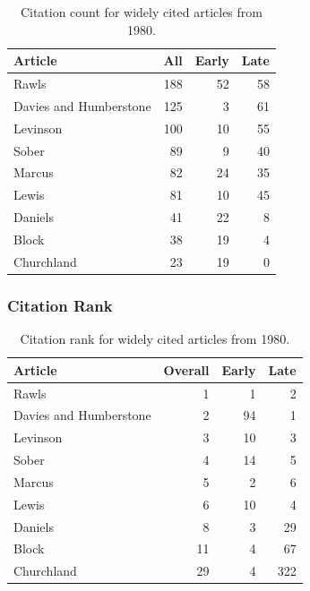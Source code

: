 \documentclass[
  10pt,
  letterpaper,
  DIV=11,
  numbers=noendperiod,
  twoside]{scrartcl}
\begin{document}
\begin{longtable}[]{@{}lrrr@{}}

\caption{\label{tbl-citation-count-1980}Citation count for widely cited
articles from 1980.}

\tabularnewline

\toprule\noalign{}
Article & All & Early & Late \\
\midrule\noalign{}
\endhead
\bottomrule\noalign{}
\endlastfoot
Rawls & 188 & 52 & 58 \\
Davies and Humberstone & 125 & 3 & 61 \\
Levinson & 100 & 10 & 55 \\
Sober & 89 & 9 & 40 \\
Marcus & 82 & 24 & 35 \\
Lewis & 81 & 10 & 45 \\
Daniels & 41 & 22 & 8 \\
Block & 38 & 19 & 4 \\
Churchland & 23 & 19 & 0 \\

\end{longtable}

\subsubsection*{Citation Rank}\label{sec-rank-1980}

\begin{longtable}[]{@{}lrrr@{}}

\caption{\label{tbl-citation-rank-1980}Citation rank for widely cited
articles from 1980.}

\tabularnewline

\toprule\noalign{}
Article & Overall & Early & Late \\
\midrule\noalign{}
\endhead
\bottomrule\noalign{}
\endlastfoot
Rawls & 1 & 1 & 2 \\
Davies and Humberstone & 2 & 94 & 1 \\
Levinson & 3 & 10 & 3 \\
Sober & 4 & 14 & 5 \\
Marcus & 5 & 2 & 6 \\
Lewis & 6 & 10 & 4 \\
Daniels & 8 & 3 & 29 \\
Block & 11 & 4 & 67 \\
Churchland & 29 & 4 & 322 \\

\end{longtable}
\end{document}
